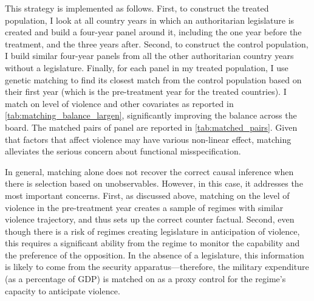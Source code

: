 This strategy is implemented as follows. First, to construct the treated population, I look at all country years in which an authoritarian legislature is created and build a four-year panel around it, including the one year before the treatment, and the three years after. Second, to construct the control population, I build similar four-year panels from all the other authoritarian country years without a legislature. Finally, for each panel in my treated population, I use genetic matching to find its closest match from the control population based on their first year (which is the pre-treatment year for the treated countries). I match on level of violence and other covariates as reported in \autoref{tab:matching_balance_largen}, significantly improving the balance across the board. The matched pairs of panel are reported in \autoref{tab:matched_pairs}. Given that factors that affect violence may have various non-linear effect, matching alleviates the serious concern about functional misspecification. 

In general, matching alone does not recover the correct causal inference when there is selection based on unobservables. However, in this case, it addresses the most important concerns. First, as discussed above, matching on the level of violence in the pre-treatment year creates a sample of regimes with similar violence trajectory, and thus sets up the correct counter factual. Second, even though there is a risk of regimes creating legislature in anticipation of violence, this requires a significant ability from the regime to monitor the capability and the preference of the opposition. In the absence of a legislature, this information is likely to come from the security apparatus---therefore, the military expenditure (as a percentage of GDP) is matched on as a proxy control for the regime's capacity to anticipate violence.

